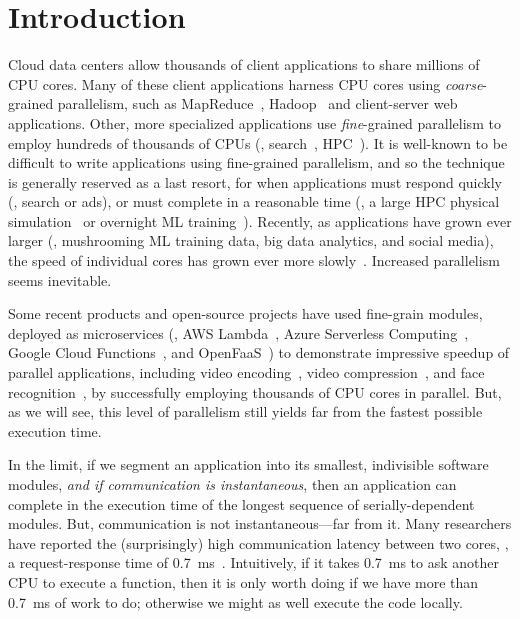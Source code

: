 \section{Introduction}

Cloud data centers allow thousands of client applications to share millions of CPU cores.
Many of these client applications harness CPU cores using {\em coarse}-grained parallelism, such as MapReduce~\cite{mapreduce-google}, Hadoop~\cite{apache-hadoop} and client-server web applications.
Other, more specialized applications use {\em fine}-grained parallelism to employ hundreds of thousands of CPUs (\eg, search~\cite{barroso2003web}, HPC~\cite{ibm-hpc}).
It is well-known to be difficult to write applications using fine-grained parallelism, and so the technique is generally reserved as a last resort, for when applications must respond quickly (\eg, search or ads), or must complete in a reasonable time (\eg, a large HPC physical simulation~\cite{changa, blue-gene-l, barnes-hut} or overnight ML training~\cite{tensorflow}).
Recently, as applications have grown ever larger (\eg, mushrooming ML training data, big data analytics, and social media), the speed of individual cores has grown ever more slowly~\cite{hp-comp-arch}.
Increased parallelism seems inevitable.

Some recent products and open-source projects have used fine-grain modules, deployed as microservices (\eg, AWS Lambda~\cite{aws-lambda}, Azure Serverless Computing~\cite{azure-functions}, Google Cloud Functions~\cite{gcloud-functions}, and OpenFaaS~\cite{openfaas}) to demonstrate impressive speedup of parallel applications, including video encoding~\cite{ExCamera}, video compression~\cite{sprocket}, and face recognition~\cite{cirrus}, by successfully employing thousands of CPU cores in parallel.
But, as we will see, this level of parallelism still yields far from the fastest possible execution time.

In the limit, if we segment an application into its smallest, indivisible software modules, {\em and if communication is instantaneous}, then an application can complete in the execution time of the longest sequence of serially-dependent modules.
But, communication is not instantaneous---far from it. 
Many researchers have reported the (surprisingly) high communication latency between two cores, \eg, a request-response time of \SI{0.7}{ms}~\cite{eRPC, perfkit-grpc}.
Intuitively, if it takes \SI{0.7}{ms} to ask another CPU to execute a function, then it is only worth doing if we have more than \SI{0.7}{ms} of work to do; otherwise we might as well execute the code locally. 


